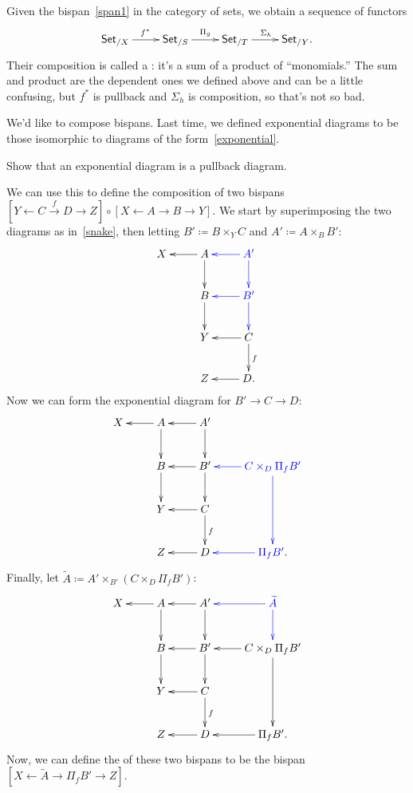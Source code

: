 Given the bispan~\eqref{span1} in the category of sets, we obtain a sequence of functors
\[\xymatrix{
	\Set_{/X}\ar[r]^{f^*} & \Set_{/S}\ar[r]^{\Pi_g} & \Set_{/T}\ar[r]^{\Sigma_h} & \Set_{/Y}.
}\]
Their composition is called a : it's a sum of a product of ``monomials.'' The sum and
product are the dependent ones we defined above and can be a little confusing, but $f^*$ is pullback and $\Sigma_h$
is composition, so that's not so bad.

We'd like to compose bispans. Last time, we defined exponential diagrams to be those isomorphic to diagrams of the
form~\eqref{exponential}.
\begin{ex}
Show that an exponential diagram is a pullback diagram.
\end{ex}
We can use this to define the composition of two bispans $[Y\gets C\stackrel f\to D\to Z]\circ[X\gets A\to B\to
Y]$. We start by superimposing the two diagrams as in~\eqref{snake}, then letting $B'\coloneqq B\times_Y C$ and
$A'\coloneqq A\times_B B'$:
\[\xymatrix{
	X & A\ar[l]\ar[d] & \textcolor{blue}{A'}\ar@[blue][l]\ar@[blue][d]\\
	& B\ar[d] & \textcolor{blue}{B'}\ar@[blue][l]\ar@[blue][d]\\
	& Y & C\ar[l]\ar[d]^f\\
	& Z & D.\ar[l]
}\]
Now we can form the exponential diagram for $B'\to C\to D$:
\[\xymatrix{
	X & A\ar[l]\ar[d] & A'\ar[l]\ar[d]\\
	& B\ar[d] & B'\ar[l]\ar[d] & \textcolor{blue}{C\times_D\Pi_fB'}\ar@[blue][l]\ar@[blue][dd]\\
	& Y & C\ar[l]\ar[d]^f\\
	& Z & D\ar[l] & \textcolor{blue}{\Pi_fB'}.\ar@[blue][l]
}\]
Finally, let $\widetilde A\coloneqq A'\times_{B'} (C\times_D\Pi_fB')$:
\[\xymatrix{
	X & A\ar[l]\ar[d] & A'\ar[l]\ar[d] & \textcolor{blue}{\widetilde A}\ar@[blue][l]\ar@[blue][d]\\
	& B\ar[d] & B'\ar[l]\ar[d] & C\times_D\Pi_fB'\ar[l]\ar[dd]\\
	& Y & C\ar[l]\ar[d]^f\\
	& Z & D\ar[l] & \Pi_fB'.\ar[l]
}\]
Now, we can define the  of these two bispans to be the bispan $[X\gets \widetilde A\to\Pi_fB'\to
Z]$.

